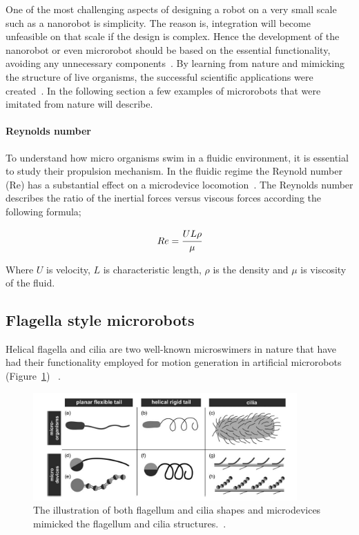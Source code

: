 \documentclass[12pt,a4paper,titlepage]{report}
\begin{document}
One of the most challenging aspects of designing a robot on a very small scale such 
as a nanorobot is simplicity. The reason is, integration will become unfeasible on that
 scale if the design is complex. Hence the development of the nanorobot or even microrobot
 should be based on the essential functionality, avoiding any unnecessary components~\citep{gao2013bioinspired}.
By learning from nature and mimicking the structure of live organisms, the successful  
scientific applications were created~\citep{qiunanohelices}. In the following section a
 few examples of microrobots that were imitated from nature will describe. 
 



\paragraph{Reynolds number}

To understand how micro organisms swim in a fluidic environment, it is essential to study their propulsion 
mechanism. In the fluidic regime the Reynold number (Re) has a substantial effect on a microdevice
locomotion~\citep{peyer2013magnetic}. The Reynolds number describes the ratio of the inertial forces versus viscous 
forces according the following formula;

\begin{equation}
  Re = \cfrac{UL\rho}{\mu}
\label{eq:4}
\end{equation}
 
Where $ U$ is velocity, $L$ is characteristic length, $\rho$ is the density and $\mu$ is viscosity of the fluid.






\subsection{Flagella style microrobots}

Helical flagella and cilia are two well-known microswimers in nature that have had their functionality employed 
for motion generation in artificial microrobots  (Figure~\ref{cilia}) ~\citep{gao2013bioinspired}. 



\begin{figure}
  \centering
    \includegraphics[width=0.9\textwidth]{cilia}
  \caption{The illustration of both flagellum and cilia shapes and microdevices mimicked the flagellum and cilia 
structures.~\citep{peyer2013bio}.}
  \label{cilia}
\end{figure}
\end{document}
